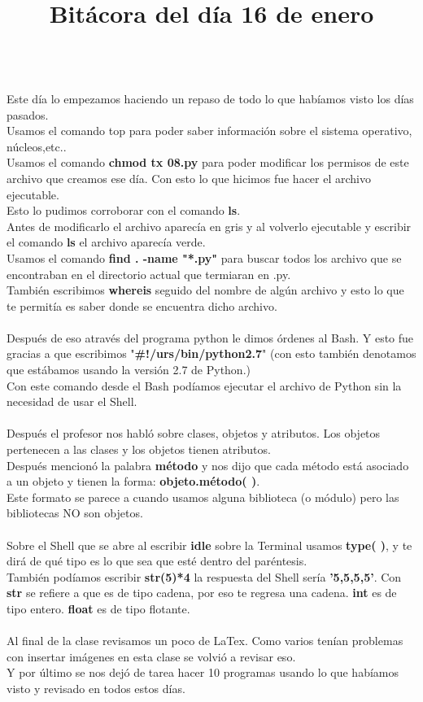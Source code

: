 \documentclass{article}
\begin{document}
	\title{\huge\textbf{Bitácora del día 16 de enero\\}} \\
	Este día lo empezamos haciendo un repaso de todo lo que habíamos visto los días pasados. \\
	Usamos el comando top para poder saber información sobre el sistema operativo, núcleos,etc..\\
	Usamos el comando \textbf{chmod tx 08.py} para poder modificar los permisos de este archivo que creamos ese día. Con esto lo que hicimos fue hacer el archivo ejecutable. \\
	Esto lo pudimos corroborar con el comando \textbf{ls}. \\
	Antes de modificarlo el archivo aparecía en gris y al volverlo ejecutable y escribir el comando \textbf{ls} el archivo aparecía verde. \\
	Usamos el comando \textbf{find . -name "*.py"} para buscar todos los archivo que se encontraban en el directorio actual que termiaran en .py.\\ 
	También escribimos \textbf{whereis } seguido del nombre de algún archivo y esto lo que te permitía es saber donde se encuentra dicho archivo.\\ \\
	Después de eso através del programa python le dimos órdenes al Bash. Y esto fue gracias a que escribimos "\textbf{\#!/urs/bin/python2.7}" (con esto también denotamos que estábamos usando la versión 2.7 de Python.) \\
	Con este comando desde el Bash podíamos ejecutar el archivo de Python sin la necesidad de usar el Shell.\\ \\ 
	Después el profesor nos habló sobre clases, objetos y atributos. Los objetos pertenecen a las clases y los objetos tienen atributos.\\
	Después mencionó la palabra \textbf{método} y nos dijo que cada método está asociado a un objeto y tienen la forma: \textbf{objeto.método( )}. \\
	Este formato se parece a cuando usamos alguna biblioteca (o módulo) pero las bibliotecas NO son objetos.\\ \\
	Sobre el Shell que se abre al escribir \textbf{idle} sobre la Terminal usamos \textbf{type( )}, y te dirá de qué tipo es lo que sea que esté dentro del paréntesis. \\
	También podíamos escribir \textbf{str(5)*4} la respuesta del Shell sería \textbf{'5,5,5,5'}. Con \textbf{str} se refiere a que es de tipo cadena, por eso te regresa una cadena. \textbf{int} es de tipo entero. \textbf{float} es de tipo flotante.\\ \\ 
	Al final de la clase revisamos un poco de LaTex. Como varios tenían problemas con insertar imágenes en esta clase se volvió a revisar eso. \\
	Y por último se nos dejó de tarea hacer 10 programas usando lo que habíamos visto y revisado en todos estos días.
	
\end{document}
